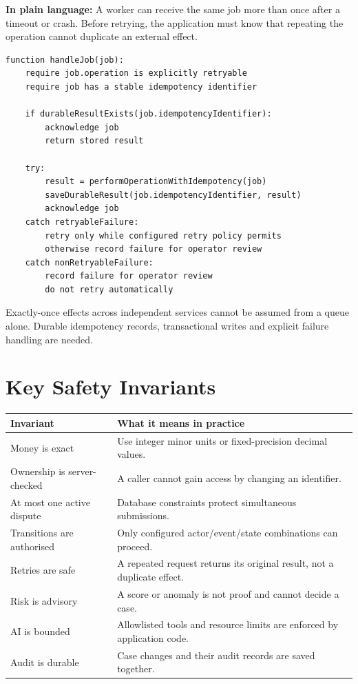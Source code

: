 \documentclass[11pt,a4paper]{article}
\begin{document}
\textbf{In plain language:} A worker can receive the same job more than
once after a timeout or crash. Before retrying, the application must
know that repeating the operation cannot duplicate an external effect.

\begin{lstlisting}[style=pseudocode,caption={Handling retryable background work}]
function handleJob(job):
    require job.operation is explicitly retryable
    require job has a stable idempotency identifier

    if durableResultExists(job.idempotencyIdentifier):
        acknowledge job
        return stored result

    try:
        result = performOperationWithIdempotency(job)
        saveDurableResult(job.idempotencyIdentifier, result)
        acknowledge job
    catch retryableFailure:
        retry only while configured retry policy permits
        otherwise record failure for operator review
    catch nonRetryableFailure:
        record failure for operator review
        do not retry automatically
\end{lstlisting}

Exactly-once effects across independent services cannot be assumed from
a queue alone. Durable idempotency records, transactional writes and
explicit failure handling are needed.

\section{Key Safety Invariants}

\begin{center}
\begin{tabular}{@{}p{}p{}@{}}
\toprule
Invariant & What it means in practice \\
\midrule
Money is exact & Use integer minor units or fixed-precision decimal values. \\
Ownership is server-checked & A caller cannot gain access by changing an identifier. \\
At most one active dispute & Database constraints protect simultaneous submissions. \\
Transitions are authorised & Only configured actor/event/state combinations can proceed. \\
Retries are safe & A repeated request returns its original result, not a duplicate effect. \\
Risk is advisory & A score or anomaly is not proof and cannot decide a case. \\
AI is bounded & Allowlisted tools and resource limits are enforced by application code. \\
Audit is durable & Case changes and their audit records are saved together. \\
\bottomrule
\end{tabular}
\end{center}
\end{document}
